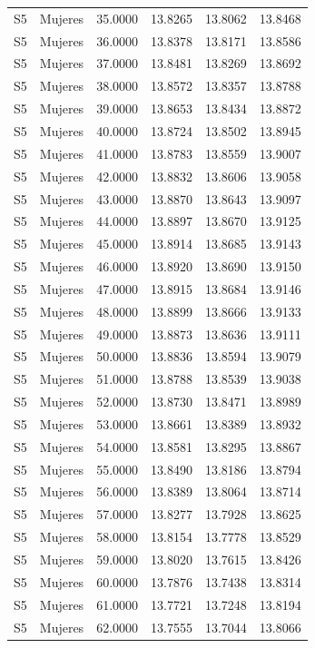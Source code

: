 \begin{longtable}{llrrrr}
S5 & Mujeres & 35.0000 & 13.8265 & 13.8062 & 13.8468 \\
S5 & Mujeres & 36.0000 & 13.8378 & 13.8171 & 13.8586 \\
S5 & Mujeres & 37.0000 & 13.8481 & 13.8269 & 13.8692 \\
S5 & Mujeres & 38.0000 & 13.8572 & 13.8357 & 13.8788 \\
S5 & Mujeres & 39.0000 & 13.8653 & 13.8434 & 13.8872 \\
S5 & Mujeres & 40.0000 & 13.8724 & 13.8502 & 13.8945 \\
S5 & Mujeres & 41.0000 & 13.8783 & 13.8559 & 13.9007 \\
S5 & Mujeres & 42.0000 & 13.8832 & 13.8606 & 13.9058 \\
S5 & Mujeres & 43.0000 & 13.8870 & 13.8643 & 13.9097 \\
S5 & Mujeres & 44.0000 & 13.8897 & 13.8670 & 13.9125 \\
S5 & Mujeres & 45.0000 & 13.8914 & 13.8685 & 13.9143 \\
S5 & Mujeres & 46.0000 & 13.8920 & 13.8690 & 13.9150 \\
S5 & Mujeres & 47.0000 & 13.8915 & 13.8684 & 13.9146 \\
S5 & Mujeres & 48.0000 & 13.8899 & 13.8666 & 13.9133 \\
S5 & Mujeres & 49.0000 & 13.8873 & 13.8636 & 13.9111 \\
S5 & Mujeres & 50.0000 & 13.8836 & 13.8594 & 13.9079 \\
S5 & Mujeres & 51.0000 & 13.8788 & 13.8539 & 13.9038 \\
S5 & Mujeres & 52.0000 & 13.8730 & 13.8471 & 13.8989 \\
S5 & Mujeres & 53.0000 & 13.8661 & 13.8389 & 13.8932 \\
S5 & Mujeres & 54.0000 & 13.8581 & 13.8295 & 13.8867 \\
S5 & Mujeres & 55.0000 & 13.8490 & 13.8186 & 13.8794 \\
S5 & Mujeres & 56.0000 & 13.8389 & 13.8064 & 13.8714 \\
S5 & Mujeres & 57.0000 & 13.8277 & 13.7928 & 13.8625 \\
S5 & Mujeres & 58.0000 & 13.8154 & 13.7778 & 13.8529 \\
S5 & Mujeres & 59.0000 & 13.8020 & 13.7615 & 13.8426 \\
S5 & Mujeres & 60.0000 & 13.7876 & 13.7438 & 13.8314 \\
S5 & Mujeres & 61.0000 & 13.7721 & 13.7248 & 13.8194 \\
S5 & Mujeres & 62.0000 & 13.7555 & 13.7044 & 13.8066 \\

\end{longtable}
